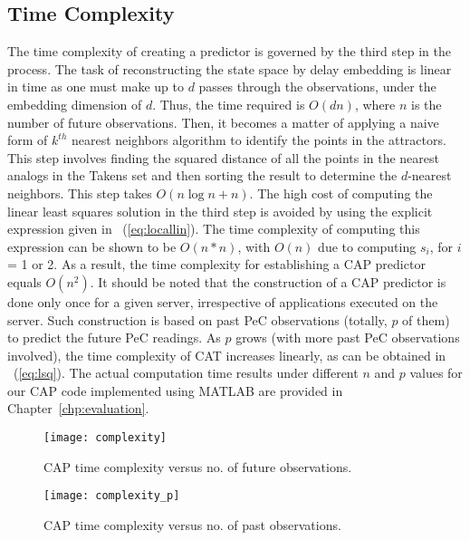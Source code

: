 \subsection{Time Complexity}  
The time complexity of creating a predictor is governed by the third
step in the process.  The task of reconstructing the state space by
delay embedding is linear in time as one must make up to $d$ passes
through the observations, under the embedding dimension of $d$.  Thus,
the time required is $O(dn)$, where $n$ is the number of future
observations.  Then, it becomes a matter of applying a naive form of
$k^{th}$ nearest neighbors algorithm to identify the points in the
attractors.  This step involves finding the squared distance of all the
points in the nearest analogs in the Takens set and then sorting the
result to determine the $d$-nearest neighbors.  This step takes
$O(n\log{n}+n)$.  The high cost of computing the linear least squares
solution in the third step is avoided by using the explicit expression
given in \equationname~(\ref{eq:locallin}).  The time complexity of
computing this expression can be shown to be $O(n*n)$, with $O(n)$ due
to computing $s_{i}$, for $i$ = 1 or 2.  As a result, the time
complexity for establishing a CAP predictor equals $O(n^{2})$.  It
should be noted that the construction of a CAP predictor is done only
once for a given server, irrespective of applications executed on the
server.  Such construction is based on past PeC observations (totally,
$p$ of them) to predict the future PeC readings.  As $p$ grows (with
more past PeC observations involved), the time complexity of CAT
increases linearly, as can be obtained in \equationname~(\ref{eq:lsq}).
The actual computation time results under different $n$ and $p$ values
for our CAP code implemented using MATLAB are provided in
Chapter~\ref{chp:evaluation}.
\begin{figure}[tp]
    \centering
    \texttt{[image: complexity]}
    \caption{CAP time complexity versus no. of future observations.}
    \label{fig:complexity}
\end{figure}
\hspace{0.3cm}
\begin{figure}
    \centering
    \texttt{[image: complexity\_p]}
    \caption{CAP time complexity versus no. of past observations.}
    \label{fig:complexityp}
\end{figure}

